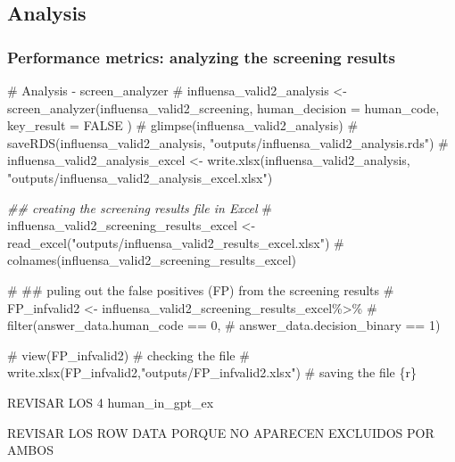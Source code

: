 \documentclass[
  letterpaper,
  DIV=11,
  numbers=noendperiod]{scrartcl}
\newenvironment{Shaded}{\begin{snugshade}}{\end{snugshade}}
\newcommand{\CommentTok}[1]{\textcolor[rgb]{0.37,0.37,0.37}{#1}}
\newcommand{\DocumentationTok}[1]{\textcolor[rgb]{0.37,0.37,0.37}{\textit{#1}}}
\begin{document}
\subsection{Analysis}\label{analysis-1}

\subsubsection{Performance metrics: analyzing the screening
results}\label{performance-metrics-analyzing-the-screening-results-1}

\begin{Shaded}
\begin{Highlighting}[]
\CommentTok{\#  Analysis {-} screen\_analyzer }
\CommentTok{\# influensa\_valid2\_analysis \textless{}{-} screen\_analyzer(influensa\_valid2\_screening, human\_decision = human\_code, key\_result = FALSE ) }
\CommentTok{\# glimpse(influensa\_valid2\_analysis)}
\CommentTok{\# saveRDS(influensa\_valid2\_analysis, "outputs/influensa\_valid2\_analysis.rds") }
\CommentTok{\# influensa\_valid2\_analysis\_excel \textless{}{-} write.xlsx(influensa\_valid2\_analysis, "outputs/influensa\_valid2\_analysis\_excel.xlsx")}
\end{Highlighting}
\end{Shaded}

\begin{Shaded}
\begin{Highlighting}[]
\DocumentationTok{\#\# creating the screening results file in Excel }
\CommentTok{\# influensa\_valid2\_screening\_results\_excel \textless{}{-} read\_excel("outputs/influensa\_valid2\_results\_excel.xlsx")}
\CommentTok{\# colnames(influensa\_valid2\_screening\_results\_excel)}


\CommentTok{\# \#\# puling out the false positives (FP) from the screening results }
\CommentTok{\# FP\_infvalid2 \textless{}{-} influensa\_valid2\_screening\_results\_excel\%\textgreater{}\% }
\CommentTok{\#   filter(answer\_data.human\_code == 0,}
\CommentTok{\#   answer\_data.decision\_binary == 1)}

\CommentTok{\# view(FP\_infvalid2) \# checking the file}
\CommentTok{\# write.xlsx(FP\_infvalid2,"outputs/FP\_infvalid2.xlsx") \# saving the file \{r\}}
\end{Highlighting}
\end{Shaded}

REVISAR LOS 4 human\_in\_gpt\_ex

REVISAR LOS ROW DATA PORQUE NO APARECEN EXCLUIDOS POR AMBOS
\end{document}
